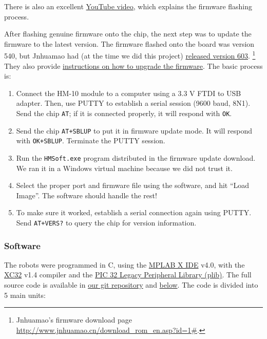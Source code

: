 \documentclass[]{article}
\providecommand{\tightlist}{%
  \setlength{\itemsep}{0pt}\setlength{\parskip}{0pt}}
\begin{document}
There is also an excellent
\href{https://www.youtube.com/watch?v=ez3491-v8Og}{YouTube video}, which
explains the firmware flashing process.

After flashing genuine firmware onto the chip, the next step was to
update the firmware to the latest version. The firmware flashed onto the
board was version 540, but Jnhuamao had (at the time we did this
project)
\href{http://www.jnhuamao.cn/rom/HMSoft-10-2541-V603.zip}{released
version 603}. \footnote{Jnhuamao's firmware download page
  \url{http://www.jnhuamao.cn/download_rom_en.asp?id=1\#}.} They also
provide
\href{http://www.jnhuamao.cn/HowToUpgradeFirmware_en.zip}{instructions
on how to upgrade the firmware}. The basic process is:

\begin{enumerate}
\def\labelenumi{\arabic{enumi}.}
\tightlist
\item
  Connect the HM-10 module to a computer using a 3.3 V FTDI to USB
  adapter. Then, use PUTTY to establish a serial session (9600 baud,
  8N1). Send the chip \texttt{AT}; if it is connected properly, it will
  respond with \texttt{OK}.
\item
  Send the chip \texttt{AT+SBLUP} to put it in firmware update mode. It
  will respond with \texttt{OK+SBLUP}. Terminate the PUTTY session.
\item
  Run the \texttt{HMSoft.exe} program distributed in the firmware update
  download. We ran it in a Windows virtual machine because we did not
  trust it.
\item
  Select the proper port and firmware file using the software, and hit
  ``Load Image''. The software should handle the rest!
\item
  To make sure it worked, establish a serial connection again using
  PUTTY. Send \texttt{AT+VERS?} to query the chip for version
  information.
\end{enumerate}

\hypertarget{software}{%
\subsubsection{Software}\label{software}}

The robots were programmed in C, using the
\href{http://www.microchip.com/mplab/mplab-x-ide}{MPLAB X IDE} v4.0,
with the \href{http://www.microchip.com/mplab/compilers}{XC32} v1.4
compiler and the
\href{http://www.microchip.com/SWLibraryWeb/product.aspx?product=PIC32\%20Peripheral\%20Library}{PIC
32 Legacy Peripheral Library (plib)}. The full source code is available
in
\href{https://github.com/orangeturtle739/bluehunters/tree/master/ble.X}{our
git repository} and
\protect\hyperlink{appendix-b-source-listing}{below}. The code is
divided into 5 main units:
\end{document}
